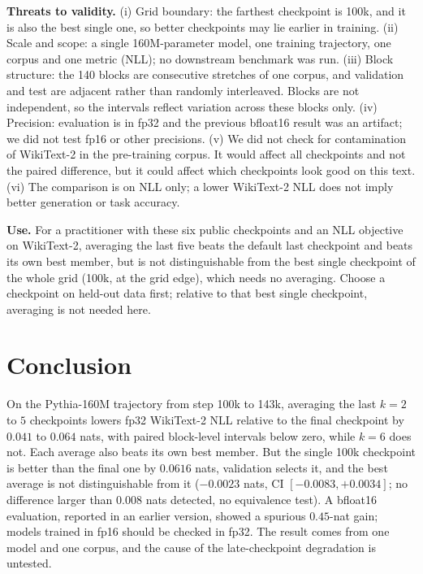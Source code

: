 \documentclass[conference]{IEEEtran}
\begin{document}
\textbf{Threats to validity.} (i) Grid boundary: the farthest checkpoint is 100k, and it is also the best single one, so better checkpoints may lie earlier in training. (ii) Scale and scope: a single 160M-parameter model, one training trajectory, one corpus and one metric (NLL); no downstream benchmark was run. (iii) Block structure: the 140 blocks are consecutive stretches of one corpus, and validation and test are adjacent rather than randomly interleaved. Blocks are not independent, so the intervals reflect variation across these blocks only. (iv) Precision: evaluation is in fp32 and the previous bfloat16 result was an artifact; we did not test fp16 or other precisions. (v) We did not check for contamination of WikiText-2 in the pre-training corpus. It would affect all checkpoints and not the paired difference, but it could affect which checkpoints look good on this text. (vi) The comparison is on NLL only; a lower WikiText-2 NLL does not imply better generation or task accuracy.

\textbf{Use.} For a practitioner with these six public checkpoints and an NLL objective on WikiText-2, averaging the last five beats the default last checkpoint and beats its own best member, but is not distinguishable from the best single checkpoint of the whole grid (100k, at the grid edge), which needs no averaging. Choose a checkpoint on held-out data first; relative to that best single checkpoint, averaging is not needed here.

\section{Conclusion}
On the Pythia-160M trajectory from step 100k to 143k, averaging the last $k=2$ to $5$ checkpoints lowers fp32 WikiText-2 NLL relative to the final checkpoint by $0.041$ to $0.064$ nats, with paired block-level intervals below zero, while $k=6$ does not. Each average also beats its own best member. But the single 100k checkpoint is better than the final one by $0.0616$ nats, validation selects it, and the best average is not distinguishable from it ($-0.0023$ nats, CI $[-0.0083,+0.0034]$; no difference larger than $0.008$ nats detected, no equivalence test). A bfloat16 evaluation, reported in an earlier version, showed a spurious $0.45$-nat gain; models trained in fp16 should be checked in fp32. The result comes from one model and one corpus, and the cause of the late-checkpoint degradation is untested.
\end{document}
